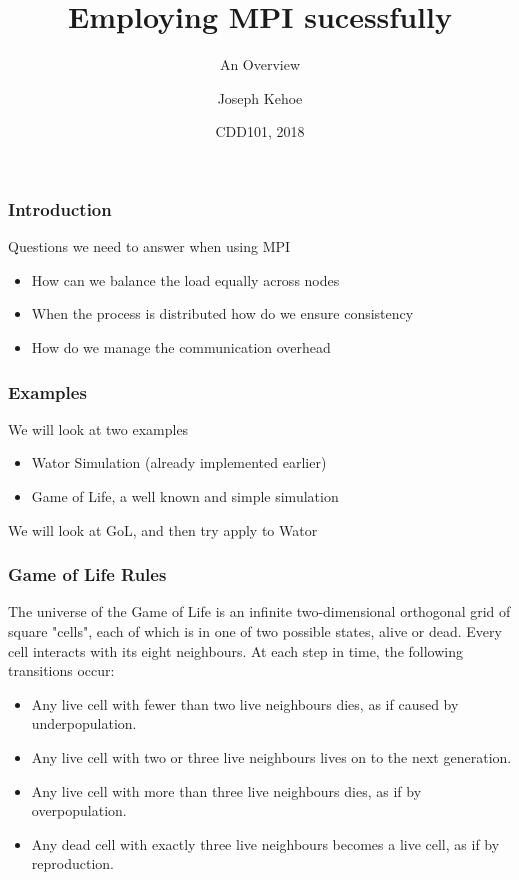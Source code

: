 \documentclass{beamer}
\title[MPI] %
{Employing MPI sucessfully}
\subtitle{An Overview}
\author[Dr. Joseph Kehoe] %
{Joseph Kehoe\inst{1}}
\institute[IT Carlow] %
{
	\inst{1}%
	Department of Computing and Networking\\
	Institute of Technology Carlow
}
\date[ITC 2018] %
{CDD101, 2018}
\begin{document}
 
\frame{\titlepage}
 
 

    \begin{frame}
    	\frametitle{Introduction}
    	Questions we need to answer when using MPI
    	\begin{itemize}
    		\item How can we balance the load equally across nodes
    		\item When the process is distributed how do we ensure consistency
    		\item How do we manage the communication overhead
    	\end{itemize}
    \end{frame}
    \begin{frame}
    	\frametitle{Examples}
    	We will look at two examples
    	\begin{itemize}
    		\item Wator Simulation (already implemented earlier)
    		\item Game of Life, a well known and simple simulation
    	\end{itemize}
		We will look at GoL, and then try apply to Wator
    \end{frame}    
        \begin{frame}
        	\frametitle{Game of Life Rules}
        		The universe of the Game of Life is an infinite two-dimensional orthogonal grid of square "cells", each of which is in one of two possible states, alive or dead. Every cell interacts with its eight neighbours. At each step in time, the following transitions occur:
        	\begin{itemize}
        		\item Any live cell with fewer than two live neighbours dies, as if caused by underpopulation.
        		\item Any live cell with two or three live neighbours lives on to the next generation.
        		\item Any live cell with more than three live neighbours dies, as if by overpopulation.
        		\item Any dead cell with exactly three live neighbours becomes a live cell, as if by reproduction.
        	\end{itemize}
        \end{frame} 
\end{document}
